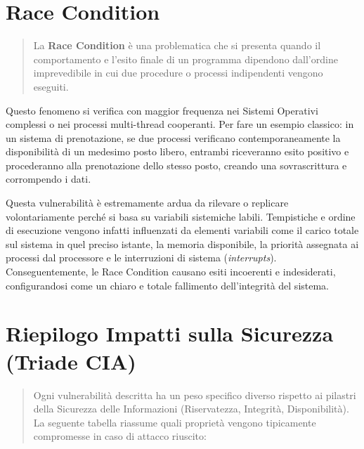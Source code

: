 \documentclass{article}
\begin{document}
\vspace{0.8cm}

\section*{Race Condition}

\begin{quote}
    La \textbf{Race Condition} è una problematica che si presenta quando il comportamento e l'esito finale di un programma dipendono dall'ordine imprevedibile in cui due procedure o processi indipendenti vengono eseguiti.
\end{quote}

Questo fenomeno si verifica con maggior frequenza nei Sistemi Operativi complessi o nei processi multi-thread cooperanti. Per fare un esempio classico: in un sistema di prenotazione, se due processi verificano contemporaneamente la disponibilità di un medesimo posto libero, entrambi riceveranno esito positivo e procederanno alla prenotazione dello stesso posto, creando una sovrascrittura e corrompendo i dati.

Questa vulnerabilità è estremamente ardua da rilevare o replicare volontariamente perché si basa su variabili sistemiche labili. Tempistiche e ordine di esecuzione vengono infatti influenzati da elementi variabili come il carico totale sul sistema in quel preciso istante, la memoria disponibile, la priorità assegnata ai processi dal processore e le interruzioni di sistema (\textit{interrupts}). Conseguentemente, le Race Condition causano esiti incoerenti e indesiderati, configurandosi come un chiaro e totale fallimento dell'integrità del sistema.

\vspace{0.8cm}

\section*{Riepilogo Impatti sulla Sicurezza (Triade CIA)}

\begin{quote}
    Ogni vulnerabilità descritta ha un peso specifico diverso rispetto ai pilastri della Sicurezza delle Informazioni (Riservatezza, Integrità, Disponibilità). La seguente tabella riassume quali proprietà vengono tipicamente compromesse in caso di attacco riuscito:
\end{quote}

\vspace{0.5cm}
\end{document}
